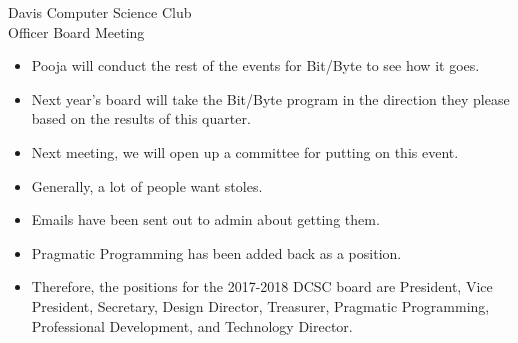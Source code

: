 \documentclass{article}
\begin{document}
\begin{Minutes}{Davis Computer Science Club\\Officer Board Meeting}
\begin{itemize}
    \item Pooja will conduct the rest of the events for Bit/Byte to see how it goes.
    \item Next year's board will take the Bit/Byte program in the direction they please based on the results of this quarter.
\end{itemize}

\begin{itemize}
    \item Next meeting, we will open up a committee for putting on this event. 
\end{itemize}

\begin{itemize}
    \item Generally, a lot of people want stoles. 
    \item Emails have been sent out to admin about getting them.
\end{itemize}

\begin{itemize}
	\item Pragmatic Programming has been added back as a position.
	\item Therefore, the positions for the 2017-2018 DCSC board are President, Vice President, Secretary, Design Director, Treasurer, Pragmatic Programming, Professional Development, and Technology Director.
\end{itemize}
\thispagestyle{creditfooter}

\end{Minutes}
\end{document}
